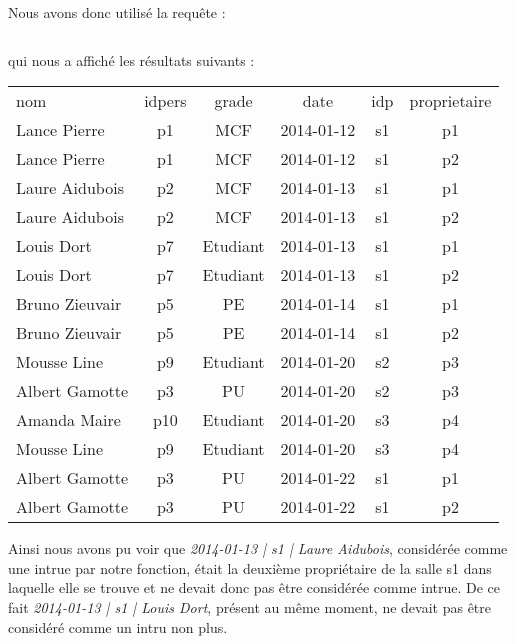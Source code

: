 Nous avons donc utilisé la requête :
\inputminted[tabsize=4,linenos,fontsize=\small]{sql}{code/2.sql}

qui nous a affiché les résultats suivants :

\begin{center}
	\begin{tabular}
		{| l |	c |	c | c | c | c |} \hline
		nom       & idpers &  grade   &    date    & idp & proprietaire \\ \hlineGras
		 Lance Pierre   & p1      & MCF      & 2014-01-12 & s1  & p1 \\ \hline
		 Lance Pierre   & p1     & MCF      & 2014-01-12 & s1  & p2 \\ \hline
		 Laure Aidubois & p2     & MCF      & 2014-01-13 & s1  & p1 \\ \hline 
		 Laure Aidubois & p2     & MCF      & 2014-01-13 & s1  & p2 \\ \hline
		 Louis Dort     & p7     & Etudiant & 2014-01-13 & s1  & p1 \\ \hline
		 Louis Dort     & p7     & Etudiant & 2014-01-13 & s1  & p2 \\ \hline
		 Bruno Zieuvair & p5     & PE       & 2014-01-14 & s1  & p1 \\ \hline
		 Bruno Zieuvair & p5     & PE       & 2014-01-14 & s1  & p2 \\ \hline
		 Mousse Line    & p9     & Etudiant & 2014-01-20 & s2  & p3 \\ \hline
		 Albert Gamotte & p3     & PU       & 2014-01-20 & s2  & p3 \\ \hline
		 Amanda Maire   & p10    & Etudiant & 2014-01-20 & s3  & p4 \\ \hline
		 Mousse Line    & p9     & Etudiant & 2014-01-20 & s3  & p4 \\ \hline
		 Albert Gamotte & p3     & PU       & 2014-01-22 & s1  & p1 \\ \hline
		 Albert Gamotte & p3     & PU       & 2014-01-22 & s1  & p2 \\ \hline
	\end{tabular}
\end{center}

Ainsi nous avons pu voir que \textit{2014-01-13 | s1 | Laure Aidubois}, considérée comme une intrue par notre fonction, était la deuxième propriétaire de la salle s1 dans laquelle elle se trouve et ne devait donc pas être considérée comme intrue. De ce fait \textit{2014-01-13 | s1 | Louis Dort}, présent au même moment, ne devait pas être considéré comme un intru non plus.

